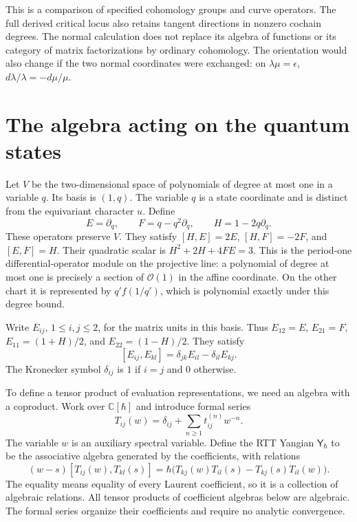 This is a comparison of specified cohomology groups and curve operators.
The full derived critical locus also retains tangent directions in nonzero cochain degrees.
The normal calculation does not replace its algebra of functions or its category of matrix factorizations by ordinary cohomology.
The orientation would also change if the two normal coordinates were exchanged: on $\lambda\mu=\epsilon$, $d\lambda/\lambda=-d\mu/\mu$.

\section{The algebra acting on the quantum states}

Let $V$ be the two-dimensional space of polynomials of degree at most one in a variable $q$.
Its basis is $(1,q)$.
The variable $q$ is a state coordinate and is distinct from the equivariant character $u$.
Define
\[
 E=\partial_q,\qquad F=q-q^2\partial_q,\qquad H=1-2q\partial_q.
\]
These operators preserve $V$.
They satisfy $[H,E]=2E$, $[H,F]=-2F$, and $[E,F]=H$.
Their quadratic scalar is $H^2+2H+4FE=3$.
This is the period-one differential-operator module on the projective line: a polynomial of degree at most one is precisely a section of $\mathcal O(1)$ in the affine coordinate.
On the other chart it is represented by $q' f(1/q')$, which is polynomial exactly under this degree bound.

Write $E_{ij}$, $1\leq i,j\leq2$, for the matrix units in this basis.
Thus $E_{12}=E$, $E_{21}=F$, $E_{11}=(1+H)/2$, and $E_{22}=(1-H)/2$.
They satisfy
\[
 [E_{ij},E_{kl}]=\delta_{jk}E_{il}-\delta_{il}E_{kj}.
\]
The Kronecker symbol $\delta_{ij}$ is $1$ if $i=j$ and $0$ otherwise.

To define a tensor product of evaluation representations, we need an algebra with a coproduct.
Work over $\mathbb C[\hbar]$ and introduce formal series
\[
 T_{ij}(w)=\delta_{ij}+\sum_{n\geq1}t_{ij}^{(n)}w^{-n}.
\]
The variable $w$ is an auxiliary spectral variable.
Define the RTT Yangian $\mathsf Y_\hbar$ to be the associative algebra generated by the coefficients, with relations
\begin{equation}\label{eq:gi-rtt-components}
 (w-s)[T_{ij}(w),T_{kl}(s)]
 =\hbar\bigl(T_{kj}(w)T_{il}(s)-T_{kj}(s)T_{il}(w)\bigr).
\end{equation}
The equality means equality of every Laurent coefficient, so it is a collection of algebraic relations.
All tensor products of coefficient algebras below are algebraic.
The formal series organize their coefficients and require no analytic convergence.

